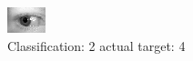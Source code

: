 \begin{figure}[h!]
\begin{center}
\includegraphics[width=0.60\columnwidth]{figures/ID720_class_2_target_4.png}
\end{center}
\caption{ Classification: 2 actual target: 4}
\label{fig:ID720_class_2_target_4}
\end{figure}
